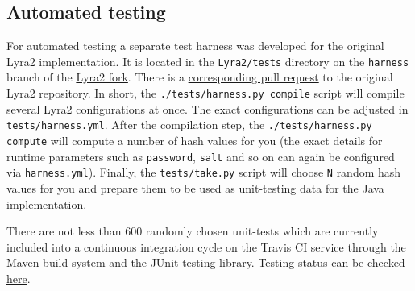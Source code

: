 \subsection{Automated testing}

For automated testing a separate test harness was developed for the original Lyra2 implementation. It is located in the \verb|Lyra2/tests| directory on the \verb|harness| branch of the \href{https://github.com/all3fox/Lyra/tree/harness}{Lyra2 fork}. There is a \href{https://github.com/leocalm/Lyra/pull/7}{corresponding pull request} to the original Lyra2 repository. In short, the \texttt{./tests/harness.py compile} script will compile several Lyra2 configurations at once. The exact configurations can be adjusted in \verb|tests/harness.yml|. After the compilation step, the \texttt{./tests/harness.py compute} will compute a number of hash values for you (the exact details for runtime parameters such as \verb|password|, \verb|salt| and so on can again be configured via \verb|harness.yml|). Finally, the \verb|tests/take.py| script will choose \verb|N| random hash values for you and prepare them to be used as unit-testing data for the Java implementation.

There are not less than 600 randomly chosen unit-tests which are currently included into a continuous integration cycle on the Travis CI service through the Maven build system and the JUnit testing library. Testing status can be \href{https://travis-ci.org/all3fox/lyra2-java}{checked here}.
